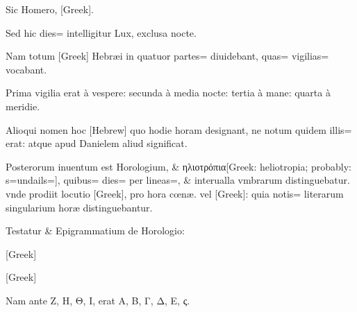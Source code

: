 \begin{parnumbers}

Sic Homero, [Greek].

Sed hic dies= intelligitur Lux, exclusa nocte.

Nam totum [Greek] Hebræi in quatuor partes= diuidebant, quas= vigilias= vocabant.

Prima vigilia erat à vespere: secunda à media nocte: tertia à mane: quarta à meridie.

Alioqui nomen hoc [Hebrew] quo hodie horam designant, ne notum quidem illis= erat: atque apud Danielem aliud significat.

Posterorum inuentum est Horologium, \& ηλιοτρόπια[Greek: heliotropia; probably: s=undails=], quibus= dies= per lineas=, \& interualla vmbrarum distinguebatur. vnde prodiit locutio [Greek], pro hora cœnæ. vel [Greek]:  quia notis= literarum singularium horæ distinguebantur.

Testatur \& Epigrammatium de Horologio:

[Greek]

[Greek]

Nam ante Ζ, Η, Θ, Ι, erat Α, Β, Γ, Δ, Ε, ς.


\end{parnumbers}
